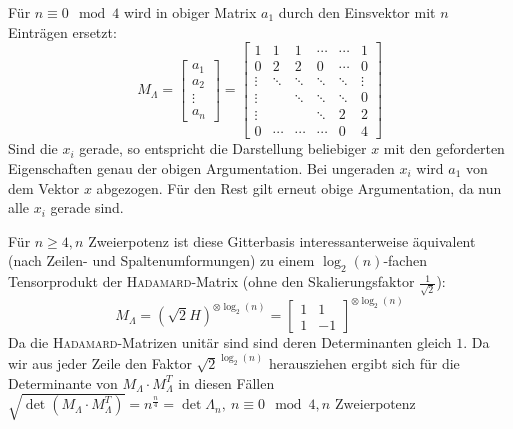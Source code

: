 Für $n \equiv 0\mod4$ wird in obiger Matrix $a_1$ durch den Einsvektor mit $n$
Einträgen ersetzt: 
\[
M_\Lambda = \begin{bmatrix} a_1 \\ a_2 \\ \vdots \\ a_n \end{bmatrix} = 
	\begin{bmatrix}
		1&1&1&\cdots&\cdots&1\\
		0&2&2&0&\cdots&0\\
		\vdots&\ddots&\ddots&\ddots&\ddots&\vdots\\
		\vdots&&\ddots&\ddots&\ddots&0\\
		\vdots&&&\ddots&2&2\\
		0&\cdots&\cdots&\cdots&0&4
	\end{bmatrix}
\]
Sind die $x_i$ gerade, so entspricht die Darstellung beliebiger $x$ mit den
geforderten Eigenschaften genau der obigen Argumentation. Bei ungeraden $x_i$
wird $a_1$ von dem Vektor $x$ abgezogen. Für den Rest gilt erneut obige
Argumentation, da nun alle $x_i$ gerade sind.

Für $n \geq 4, n$ Zweierpotenz ist diese Gitterbasis interessanterweise
äquivalent (nach Zeilen- und Spaltenumformungen) zu einem $\log_2(n)$-fachen
Tensorprodukt der \textsc{Hadamard}-Matrix (ohne den Skalierungsfaktor
$\frac{1}{\sqrt{2}}$):
\[ M_\Lambda = (\sqrt{2}H)^{\otimes\log_2(n)} = \begin{bmatrix} 1&1\\1&-1
\end{bmatrix}^{\otimes\log_2(n)} \]
Da die \textsc{Hadamard}-Matrizen unitär sind sind deren Determinanten gleich
$1$. Da wir aus jeder Zeile den Faktor $\sqrt{2}^{\log_2(n)}$ herausziehen
ergibt sich für die Determinante von $M_\Lambda \cdot M_\Lambda^T$ in diesen
Fällen $\sqrt{\det(M_\Lambda \cdot M_\Lambda^T)} = n^{\frac{n}{4}} =
\det{\Lambda_n},\ n \equiv 0\mod4, n \text{ Zweierpotenz}$
